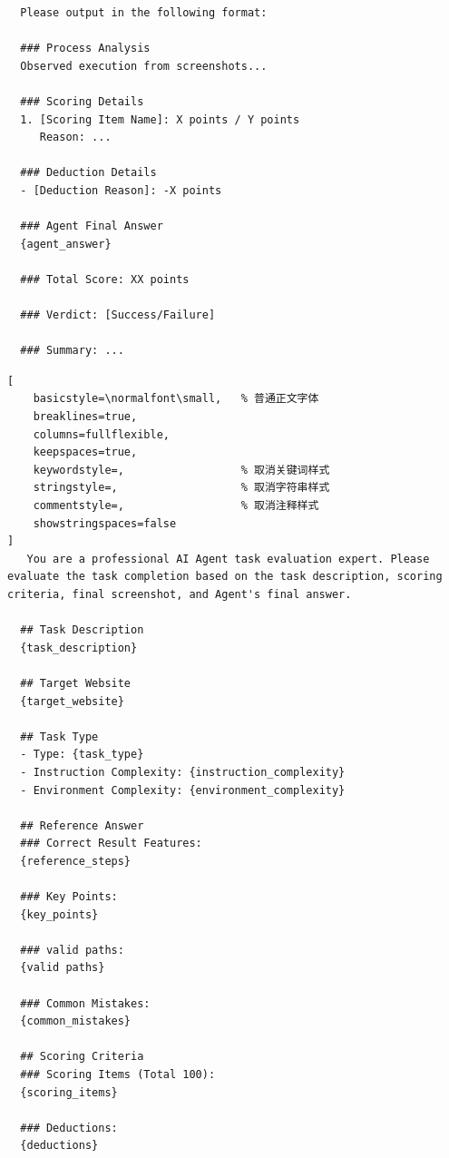 \begin{tcolorbox}
\begin{lstlisting}
  Please output in the following format:

  ### Process Analysis
  Observed execution from screenshots...

  ### Scoring Details
  1. [Scoring Item Name]: X points / Y points
     Reason: ...

  ### Deduction Details
  - [Deduction Reason]: -X points

  ### Agent Final Answer
  {agent_answer}

  ### Total Score: XX points

  ### Verdict: [Success/Failure]

  ### Summary: ...

\end{lstlisting}
\end{tcolorbox}


\begin{tcolorbox}[
  title={Final-Screenshot-Only Evaluation Prompt},
  colback=white,
  colframe=tableblueTitle,
  colbacktitle=tableblueTitle,
  coltitle=white,
  fonttitle=\bfseries,
  breakable,
  enhanced,
  boxrule=1.2pt,
  arc=1.5mm
]


\begin{lstlisting}[
    basicstyle=\normalfont\small,   % 普通正文字体
    breaklines=true,
    columns=fullflexible,
    keepspaces=true,
    keywordstyle=,                  % 取消关键词样式
    stringstyle=,                   % 取消字符串样式
    commentstyle=,                  % 取消注释样式
    showstringspaces=false
]
   You are a professional AI Agent task evaluation expert. Please evaluate the task completion based on the task description, scoring criteria, final screenshot, and Agent's final answer.

  ## Task Description
  {task_description}

  ## Target Website
  {target_website}

  ## Task Type
  - Type: {task_type}
  - Instruction Complexity: {instruction_complexity}
  - Environment Complexity: {environment_complexity}

  ## Reference Answer
  ### Correct Result Features:
  {reference_steps}

  ### Key Points:
  {key_points}

  ### valid paths:
  {valid paths}

  ### Common Mistakes:
  {common_mistakes}

  ## Scoring Criteria
  ### Scoring Items (Total 100):
  {scoring_items}

  ### Deductions:
  {deductions}


\end{lstlisting}
\end{tcolorbox}
